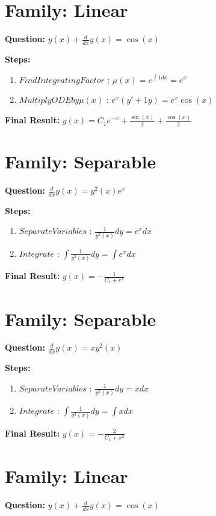 \documentclass{article}
\begin{document}
\section*{Family: Linear}
\textbf{Question:} $y{\left(x \right)} + \frac{d}{d x} y{\left(x \right)} = \cos{\left(x \right)}$

\textbf{Steps:}
\begin{enumerate}
\item $Find Integrating Factor$ :  $\mu(x) = e^{\int 1 dx} = e^{x}$
\item $Multiply ODE by \mu(x)$ :  $e^{x}(y' + 1y) = e^{x} \cos{\left(x \right)}$
\end{enumerate}
\textbf{Final Result:} $y{\left(x \right)} = C_{1} e^{- x} + \frac{\sin{\left(x \right)}}{2} + \frac{\cos{\left(x \right)}}{2}$

\section*{Family: Separable}
\textbf{Question:} $\frac{d}{d x} y{\left(x \right)} = y^{2}{\left(x \right)} e^{x}$

\textbf{Steps:}
\begin{enumerate}
\item $Separate Variables$ :  $\frac{1}{y^{2}{\left(x \right)}} dy = e^{x} dx$
\item $Integrate$ :  $\int \frac{1}{y^{2}{\left(x \right)}} dy = \int e^{x} dx$
\end{enumerate}
\textbf{Final Result:} $y{\left(x \right)} = - \frac{1}{C_{1} + e^{x}}$

\section*{Family: Separable}
\textbf{Question:} $\frac{d}{d x} y{\left(x \right)} = x y^{2}{\left(x \right)}$

\textbf{Steps:}
\begin{enumerate}
\item $Separate Variables$ :  $\frac{1}{y^{2}{\left(x \right)}} dy = x dx$
\item $Integrate$ :  $\int \frac{1}{y^{2}{\left(x \right)}} dy = \int x dx$
\end{enumerate}
\textbf{Final Result:} $y{\left(x \right)} = - \frac{2}{C_{1} + x^{2}}$

\section*{Family: Linear}
\textbf{Question:} $y{\left(x \right)} + \frac{d}{d x} y{\left(x \right)} = \cos{\left(x \right)}$
\end{document}
